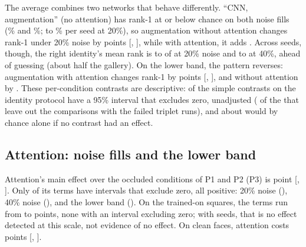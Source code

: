 The average combines two networks that behave differently. ``CNN, augmentation'' (no attention) has rank-1 at or below chance on both noise fills (\% and \%;  to \% per seed at 20\%), so augmentation without attention changes rank-1 under 20\% noise by  points [, ], while with attention, it adds . Across seeds, though, the right identity's mean rank is  to  of  at 20\% noise and  to  at 40\%, ahead of guessing (about half the gallery). On the lower band, the pattern reverses: augmentation with attention changes rank-1 by  points [, ], and without attention by . These per-condition contrasts are descriptive:  of the  simple contrasts on the identity protocol have a 95\% interval that excludes zero, unadjusted ( of the  that leave out the  comparisons with the failed triplet runs), and about  would by chance alone if no contrast had an effect.

\subsection{Attention: noise fills and the lower band}

Attention's main effect over the  occluded conditions of P1 and P2 (P3) is  point [, ]. Only  of its  terms have intervals that exclude zero, all positive: 20\% noise (), 40\% noise (), and the lower band (). On the  trained-on squares, the terms run from  to  points, none with an interval excluding zero; with  seeds, that is no effect detected at this scale, not evidence of no effect. On clean faces, attention costs  points [, ].

